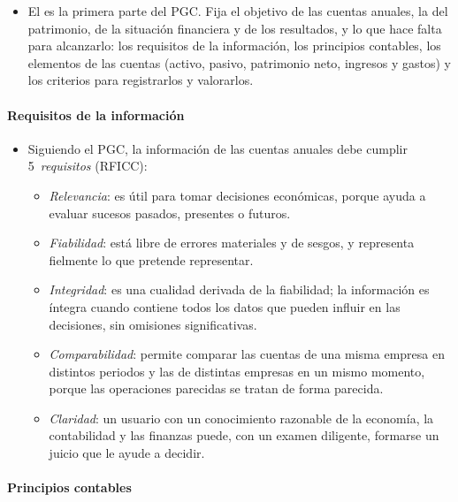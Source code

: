 \documentclass[11pt]{article}
\begin{document}
\begin{itemize}
\item El  es la primera parte del PGC. Fija el objetivo de las cuentas anuales, la  del patrimonio, de la situación financiera y de los resultados, y lo que hace falta para alcanzarlo: los requisitos de la información, los principios contables, los elementos de las cuentas (activo, pasivo, patrimonio neto, ingresos y gastos) y los criterios para registrarlos y valorarlos.
\end{itemize}

\paragraph{Requisitos de la información}

\begin{itemize}
\item Siguiendo el PGC, la información de las cuentas anuales debe cumplir 5~\emph{requisitos} (RFICC):
  \begin{itemize}
  \item \emph{Relevancia}: es útil para tomar decisiones económicas, porque ayuda a evaluar sucesos pasados, presentes o futuros.
  \item \emph{Fiabilidad}: está libre de errores materiales y de sesgos, y representa fielmente lo que pretende representar.
  \item \emph{Integridad}: es una cualidad derivada de la fiabilidad; la información es íntegra cuando contiene todos los datos que pueden influir en las decisiones, sin omisiones significativas.
  \item \emph{Comparabilidad}: permite comparar las cuentas de una misma empresa en distintos periodos y las de distintas empresas en un mismo momento, porque las operaciones parecidas se tratan de forma parecida.
  \item \emph{Claridad}: un usuario con un conocimiento razonable de la economía, la contabilidad y las finanzas puede, con un examen diligente, formarse un juicio que le ayude a decidir.
  \end{itemize}
\end{itemize}

\paragraph{Principios contables}
\end{document}
